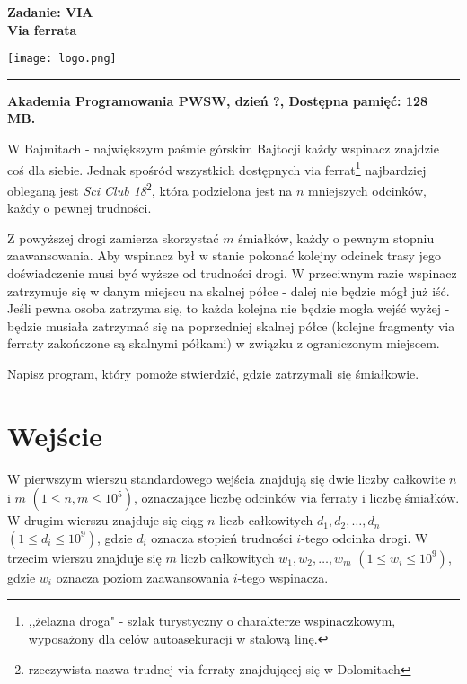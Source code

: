 \documentclass[10pt]{article}
\begin{document}
    

    \noindent
    \begin{minipage}{0.5\textwidth}
        \LARGE{\textsf{\textbf{Zadanie: VIA\\Via ferrata}}}
    \end{minipage}
    \begin{minipage}{0.5\textwidth}
        \begin{flushright}
            \texttt{[image: logo.png]}
        \end{flushright}
    \end{minipage}
    
    \noindent\rule{\textwidth}{0.4pt}
    
    \noindent\textbf{Akademia Programowania PWSW, dzień ?, Dostępna pamięć: 128 MB.}
    \vspace{1em}
    
    
    \noindent
    W Bajmitach - największym paśmie górskim Bajtocji każdy wspinacz znajdzie coś dla siebie. Jednak spośród wszystkich dostępnych via ferrat\footnote{,,żelazna droga" - szlak turystyczny o charakterze wspinaczkowym, wyposażony dla celów autoasekuracji w stalową linę.} najbardziej obleganą jest \textit{Sci Club 18}\footnote{rzeczywista nazwa trudnej via ferraty znajdującej się w Dolomitach}, która podzielona jest na $n$ mniejszych odcinków, każdy o pewnej trudności. 

    Z powyższej drogi zamierza skorzystać $m$ śmiałków, każdy o pewnym stopniu zaawansowania. Aby wspinacz był w stanie pokonać kolejny odcinek trasy jego doświadczenie musi być wyższe od trudności drogi. W przeciwnym razie wspinacz zatrzymuje się w danym miejscu na skalnej półce - dalej nie będzie mógł już iść. Jeśli pewna osoba zatrzyma się, to każda kolejna nie będzie mogła wejść wyżej - będzie musiała zatrzymać się na poprzedniej skalnej półce (kolejne fragmenty via ferraty zakończone są skalnymi półkami) w związku z ograniczonym miejscem.

    Napisz program, który pomoże stwierdzić, gdzie zatrzymali się śmiałkowie.


    \section*{Wejście}
    
    W pierwszym wierszu standardowego wejścia znajdują się dwie liczby całkowite $n$ i $m$ $(1 \leq n, m \leq 10^{5})$, oznaczające liczbę odcinków via ferraty i liczbę śmiałków. W drugim wierszu znajduje się ciąg $n$ liczb całkowitych $d_{1}, d_{2}, \ldots, d_{n}$ $(1 \leq d_{i} \leq 10^{9})$, gdzie $d_{i}$ oznacza stopień trudności $i$-tego odcinka drogi. W trzecim wierszu znajduje się $m$ liczb całkowitych $w_{1}, w_{2}, \ldots, w_{m}$ $(1 \leq w_{i} \leq 10^{9})$, gdzie $w_{i}$ oznacza poziom zaawansowania $i$-tego wspinacza.
\end{document}
